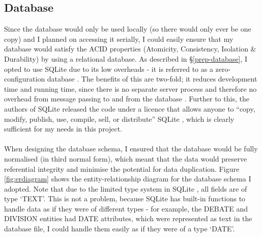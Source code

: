 \documentclass[12pt,a4paper,twoside,openright]{report}
\newcommand{\mylisting}[4]{}
\newcommand{\pylisting}[2]{\mylisting{Python}{py}{#1}{#2}}
\begin{document}
\pylisting{Function that matches an MP's name in the Hansard }{match_full_name}

\subsection{Database} \label{impl-database}

Since the database would only be used locally (so there would only ever be one copy) and I planned on accessing it serially, I could easily ensure that my database would satisfy the ACID properties (Atomicity, Consistency, Isolation \& Durability) by using a relational database. As described in \S\ref{prep-database}, I opted to use SQLite due to its low overheads - it is referred to as a zero-configuration database \cite{sqlitezeroconfig}. The benefits of this are two-fold; it reduces development time and running time, since there is no separate server process and therefore no overhead from message passing to and from the database \cite{sqliteserverless}. Further to this, the authors of SQLite released the code under a licence that allows anyone to ``copy, modify, publish, use, compile, sell, or distribute'' SQLite \cite{sqlitelicence}, which is clearly sufficient for my needs in this project.
\\\\
When designing the database schema, I ensured that the database would be fully normalised (in third normal form), which meant that the data would preserve referential integrity and minimise the potential for data duplication. Figure \ref{fig:erdiagram} shows the entity-relationship diagram for the database schema I adopted. Note that due to the limited type system in SQLite \cite{sqlitetypes}, all fields are of type `TEXT'. This is not a problem, because SQLite has built-in functions to handle data as if they were of different types - for example, the DEBATE and DIVISION entities had DATE attributes, which were represented as text in the database file, I could handle them easily as if they were of a type `DATE'.
\\\\
\end{document}
